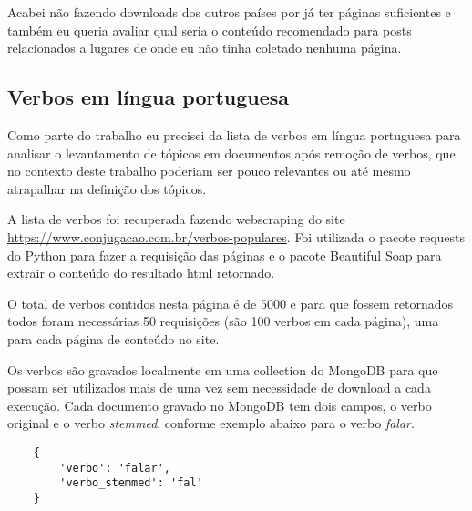 Acabei não fazendo downloads dos outros países por já ter páginas suficientes e também eu queria avaliar qual seria o conteúdo recomendado para posts relacionados a lugares de onde eu não tinha coletado nenhuma página.


\subsection{Verbos em língua portuguesa}

Como parte do trabalho eu precisei da lista de verbos em língua portuguesa para analisar o levantamento de tópicos em documentos após remoção de verbos, 
que no contexto deste trabalho poderiam ser pouco relevantes ou até mesmo atrapalhar na definição dos tópicos.

A lista de verbos foi recuperada fazendo webscraping do site \url{https://www.conjugacao.com.br/verbos-populares}. Foi utilizada o pacote requests do Python 
para fazer a requisição das páginas e o pacote Beautiful Soap para extrair o conteúdo do resultado html retornado.

O total de verbos contidos nesta página é de 5000 e para que fossem retornados todos foram necessárias 50 requisições (são 100 verbos em cada página), 
uma para cada página de conteúdo no site.

Os verbos são gravados localmente em uma collection do MongoDB para que possam ser utilizados mais de uma vez sem necessidade de download a cada execução.
Cada documento gravado no MongoDB tem dois campos, o verbo original e o verbo \textit{stemmed}, conforme exemplo abaixo para o verbo \textit{falar}.

\begin{lstlisting}
    {
        'verbo': 'falar',
        'verbo_stemmed': 'fal'
    }
\end{lstlisting}

\begin{comment}
\subsection{Melhores Destinos}

Obtenção de posts com conteúdo de promoções do blog Melhores Destinos.    
\end{comment}

